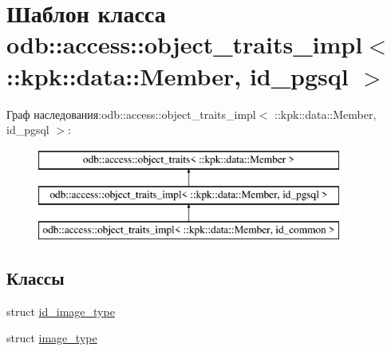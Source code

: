 \hypertarget{classodb_1_1access_1_1object__traits__impl_3_01_1_1kpk_1_1data_1_1_member_00_01id__pgsql_01_4}{}\section{Шаблон класса odb\+:\+:access\+:\+:object\+\_\+traits\+\_\+impl$<$ \+:\+:kpk\+:\+:data\+:\+:Member, id\+\_\+pgsql $>$}
\label{classodb_1_1access_1_1object__traits__impl_3_01_1_1kpk_1_1data_1_1_member_00_01id__pgsql_01_4}
Граф наследования\+:odb\+:\+:access\+:\+:object\+\_\+traits\+\_\+impl$<$ \+:\+:kpk\+:\+:data\+:\+:Member, id\+\_\+pgsql $>$\+:\begin{figure}[H]
\begin{center}
\leavevmode
\includegraphics[height=3.000000cm]{classodb_1_1access_1_1object__traits__impl_3_01_1_1kpk_1_1data_1_1_member_00_01id__pgsql_01_4}
\end{center}
\end{figure}
\subsection*{Классы}
\begin{DoxyCompactItemize}
\item 
struct \hyperlink{structodb_1_1access_1_1object__traits__impl_3_01_1_1kpk_1_1data_1_1_member_00_01id__pgsql_01_4_1_1id__image__type}{id\+\_\+image\+\_\+type}
\item 
struct \hyperlink{structodb_1_1access_1_1object__traits__impl_3_01_1_1kpk_1_1data_1_1_member_00_01id__pgsql_01_4_1_1image__type}{image\+\_\+type}
\end{DoxyCompactItemize}
